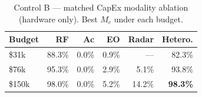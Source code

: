\begin{table}[t]
\centering
\caption{Control B — matched CapEx modality ablation (hardware only). Best $M_c$ under each budget.}
\label{tab:modality_ablation}
\setlength{\tabcolsep}{4pt}
\begin{tabular}{lrrrrr}
\toprule
Budget & RF & Ac & EO & Radar & Hetero. \\
\midrule
\$31k & 88.3\% & 0.0\% & 0.9\% & --- & 82.3\% \\
\$76k & 95.3\% & 0.0\% & 2.9\% & 5.1\% & 93.8\% \\
\$150k & 98.0\% & 0.0\% & 5.2\% & 14.2\% & \textbf{98.3\%} \\
\bottomrule
\end{tabular}
\end{table}
